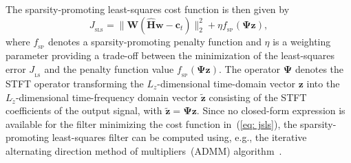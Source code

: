 \documentclass[fleqn]{aes2e}
\begin{document}
The sparsity-promoting least-squares cost function is then given by
\begin{equation}
\label{eq: jsls}
J_{_{\text{SLS}}} = \|\mathbf{W} (\hat{\mathbf{H}}\mathbf{w} - \mathbf{c}_t) \|_2^2 + \eta f_{_{\text{SP}}} (\bm{\Psi}\mathbf{z} ),
\end{equation}
where $f_{_{\text{SP}}}$ denotes a sparsity-promoting penalty function and $\eta$ is a weighting parameter providing a trade-off between the minimization of the least-squares error $J_{_{\text{LS}}}$ and the penalty function value $f_{_{\text{SP}}}(\bm{\Psi}\mathbf{z})$.
The operator $\bm{\Psi}$ denotes the STFT operator transforming the $L_{z}$-dimensional time-domain vector $\mathbf{z}$ into the $L_{\tilde{z}}$-dimensional time-frequency domain vector $\tilde{\mathbf{z}}$ consisting of the STFT coefficients of the output signal, with $\tilde{\mathbf{z}} = \bm{\Psi}\mathbf{z}$.
Since no closed-form expression is available for the filter minimizing the cost function in~(\ref{eq: jsls}), the sparsity-promoting least-squares filter can be computed using, e.g., the iterative alternating direction method of multipliers~(ADMM) algorithm~\cite{Boyd_admm_2011}.
\end{document}
